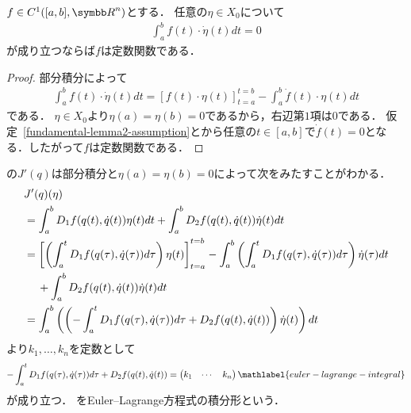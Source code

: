 \documentclass{ltjsarticle}
\begin{document}
\begin{thmbox}
\begin{theorem}
\(f \in C^1([a, b], {\Real}^{n})\)とする．
任意の\(\eta \in X_0\)について
\begin{align}
    \int_a^b f (t) \cdot \dot{\eta}(t) dt = 0
    \label{fundamental-lemma2-assumption}
\end{align}
が成り立つならば\(f\)は定数関数である．
\end{theorem}
\end{thmbox}

\begin{proof}
部分積分によって
\begin{align*}
    \int_a^b f(t) \cdot \dot{\eta}(t) dt =
    [f(t) \cdot \eta(t)]_{t = a}^{t = b} - \int_a^b \dot{f}(t) \cdot \eta(t) dt
\end{align*}
である．
\(\eta \in X_0\)より\(\eta(a) = \eta(b) = 0\)であるから，右辺第\(1\)項は\(0\)である．
仮定~\ref{fundamental-lemma2-assumption}とから任意の\(t \in [a, b]\)で\(\dot{f}(t) = 0\)となる．したがって\(f\)は定数関数である．
\end{proof}

の\(J'(q)\)は部分積分と\(\eta(a) = \eta(b) = 0\)によって次をみたすことがわかる．
\begin{align*}
    & J'(q)(\eta) \\
    & = \int_a^b D_1 f(q(t), \dot{q}(t)) \eta(t) dt + \int_a^ b D_2 f(q(t), \dot{q}(t))\dot{\eta}(t) dt \\
    & = \left[\left(\int_a^t D_1 f(q(\tau), \dot{q}(\tau)) d\tau\right) \eta(t)\right]_{t = a}^{t = b}
    - \int_a^b \left(\int_a^t D_1 f(q(\tau), \dot{q}(\tau)) d\tau \right) \dot{\eta}(\tau) dt \\
    & \mathbin{\hphantom{=}}{} + \int_a^b D_2f(q(t), \dot{q}(t)) \dot{\eta}(t) dt \\
    & = \int_a^b
    \left(
        \left(
        - \int_a^t D_1 f(q(\tau), \dot{q}(\tau)) d\tau
        +  D_2 f(q(t), \dot{q}(t))
        \right)
        \dot{\eta}(t)
    \right) dt
\end{align*}
より\(k_1, \ldots, k_n\)を定数として
\begin{align*}
    - \int_a^t D_1 f(q(\tau), \dot{q}(\tau)) d\tau
    + D_2 f(q(t), \dot{q}(t)) = \begin{pmatrix} k_1 & \cdots & k_n \end{pmatrix}
    \mathlabel{euler-lagrange-integral}
\end{align*}
が成り立つ．
をEuler--Lagrange方程式の積分形という．
\end{document}
